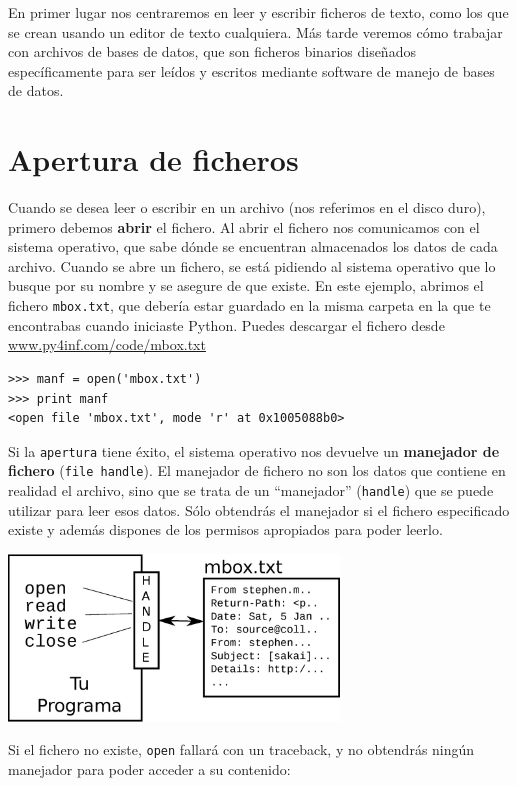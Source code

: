 En primer lugar nos centraremos en leer y escribir ficheros de texto,
como los que se crean usando un editor de texto cualquiera. Más tarde veremos cómo
trabajar con archivos de bases de datos, que son ficheros binarios diseñados
específicamente para ser leídos y escritos mediante software de manejo de bases de datos.

\section{Apertura de ficheros}

Cuando se desea leer o escribir en un archivo (nos referimos en el disco duro), primero
debemos {\bf abrir} el fichero. Al abrir el fichero nos comunicamos con el sistema
operativo, que sabe dónde se encuentran almacenados los datos de cada archivo. Cuando se
abre un fichero, se está pidiendo al sistema operativo que lo busque por su nombre
y se asegure de que existe. En este ejemplo, abrimos el fichero
{\tt mbox.txt}, que debería estar guardado en la misma carpeta en la que te
encontrabas cuando iniciaste Python.
Puedes descargar el fichero desde
\url{www.py4inf.com/code/mbox.txt}

\beforeverb
\begin{verbatim}
>>> manf = open('mbox.txt')
>>> print manf
<open file 'mbox.txt', mode 'r' at 0x1005088b0>
\end{verbatim}
\afterverb
%
Si la {\tt apertura} tiene éxito, el sistema operativo nos devuelve un
{\bf manejador de fichero} ({\tt file handle}). El manejador de fichero no son los datos que
contiene en realidad el archivo, sino que se trata de un ``manejador'' ({\tt handle}) que se
puede utilizar para leer esos datos. Sólo obtendrás el manejador si el fichero especificado
existe y además dispones de los permisos apropiados para poder leerlo.

\beforefig
\centerline{\includegraphics[height=1.75in]{figs2/handle.eps}}
\afterfig

Si el fichero no existe, {\tt open} fallará con un traceback, y no obtendrás
ningún manejador para poder acceder a su contenido:


